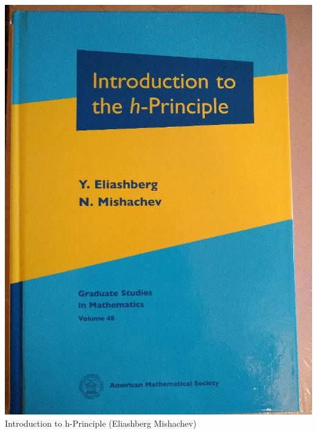 \documentclass[t]{beamer}
\newcommand{\htarget}[2]{\hypertarget{#1}{#2}}
\begin{document}
\begin{frame}\htarget{hPE}{} \begin{center}
\includegraphics[height=0.8\textheight]{Introduction_to_hPrinciple_mini.jpg} \\
Introduction to h-Principle (Eliashberg Mishachev) 
\end{center} \end{frame}
\end{document}

